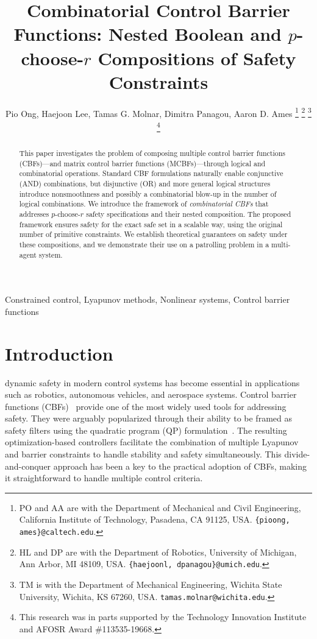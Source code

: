\documentclass[journal,twoside,web]{ieeecolor}
\title{\LARGE \textbf{Combinatorial Control Barrier Functions: Nested Boolean and $p$-choose-$r$ Compositions of Safety Constraints}}
\author{Pio Ong, Haejoon Lee, Tamas G. Molnar, Dimitra Panagou, Aaron D. Ames %
\thanks{PO and AA are with the Department of Mechanical and Civil Engineering, California Institute of Technology, Pasadena, CA 91125, USA. \texttt{\{pioong, ames\}@caltech.edu}.}
\thanks{HL and DP are with the Department of Robotics, University of Michigan, Ann Arbor, MI 48109, USA. \texttt{\{haejoonl, dpanagou\}@umich.edu}.}
\thanks{TM is with the Department of Mechanical Engineering, Wichita State University, Wichita, KS 67260, USA. \texttt{tamas.molnar@wichita.edu}.}
\thanks{This research was in parts supported by the Technology Innovation Institute and AFOSR Award \#113535-19668.}
}
\theoremstyle{definition}
\begin{document}
\maketitle
\thispagestyle{empty}
\begin{abstract}
    This paper investigates the problem of composing multiple control barrier functions (CBFs)---and matrix control barrier functions (MCBFs)---through logical and combinatorial operations. Standard CBF formulations naturally enable conjunctive (AND) combinations, but disjunctive (OR) and more general logical structures introduce nonsmoothness and possibly a combinatorial blow-up in the number of logical combinations. We introduce the framework of {\em combinatorial CBFs} that addresses $p$-choose-$r$ safety specifications and their nested composition. The proposed framework ensures safety for the exact safe set in a scalable way, using the original number of primitive constraints. We establish theoretical guarantees on safety under these compositions, and we demonstrate their use on a patrolling problem in a multi-agent system.
\end{abstract}

\begin{IEEEkeywords}
   Constrained control, Lyapunov methods, Nonlinear systems, Control barrier functions
    \end{IEEEkeywords}
    
\section{Introduction}

 dynamic safety in modern control systems has become essential in applications such as robotics, autonomous vehicles, and aerospace systems. Control barrier functions (CBFs)~\cite{ADA-SC-ME-GN-KS-PT:19} provide one of the most widely used tools for addressing safety.
They were arguably popularized through their ability to be framed as safety filters using the quadratic program (QP) formulation~\cite{ADA-XX-JWG-PT:17}. The resulting optimization-based controllers facilitate the combination of multiple Lyapunov and barrier constraints to handle stability and safety simultaneously. This divide-and-conquer approach has been a key to the practical adoption of CBFs, making it straightforward to handle multiple control criteria.
\end{document}

